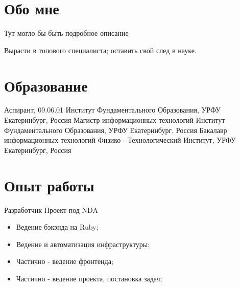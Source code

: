 \documentclass[11pt,a4paper]{moderncv}
\begin{document}
\maketitle

\section{Обо мне}
 {
  Тут могло бы быть подробное описание
}

 {
  Вырасти в топового специалиста; оставить свой след в науке.
}

\section{Образование}


  {Аспирант, 09.06.01}
  {Институт Фундаментального Образования, УРФУ}
  {Екатеринбург, Россия}
{}{}
  {Магистр информационных технологий}
  {Институт Фундаментального Образования, УРФУ}
  {Екатеринбург, Россия}
{}{}
  {Бакалавр информационных технологий}
  {Физико - Технологический Институт, УРФУ}
  {Екатеринбург, Россия}
{}{}

\section{Опыт работы}

  {Разработчик}{}
  {Проект под NDA}
  {}
{
\begin{itemize}
  \item Ведение бэкэнда на Ruby;
  \item Ведение и автоматизация инфраструктуры;
  \item Частично - ведение фронтенда;
  \item Частично - ведение проекта, постановка задач;
\end{itemize}
}
\end{document}
